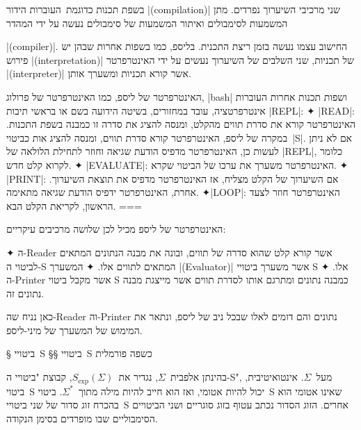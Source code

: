 בשפת תכנות כדוגמת~\CPL העוברות הידור \E|(compilation)| שני מרכיבי השיערוך
נפרדים. מתן המשמעות לסימבולים ואיתור המשמעות של סימבולים נעשה על ידי המהדר

\E|(compiler)|. החישוב עצמו נעשה בזמן ריצת התכנית. בליספ, כמו בשפות אחרות שבהן
יש פירוש \E|(interpretation)| של תכניות, שני השלבים של השיערוך נעשים על ידי
האינטרפרטר \E|(interpreter)| אשר קורא תכניות ומשערך אותן.

\begin{minipage}\linewidth
  \footnotesize
  \begin{mdframed}[backgroundcolor=Lavender!20]
    האינטרפרטר של ליספ, כמו האינטרפרטר של פרולוג, \E|bash| ושפות תכנות אחרות העוברות
    אינטרפרטציה, עובד במחזורים, בשיטה הידועה בשם
    או בראשי תיבות \E|REPL|:
    ✦ \E|READ|: האינטרפרטר קורא את סדרת תווים מהקלט, ומנסה להציג את סדרה זו
    כמבנה בשפת התכנות. במקרה של ליספ, האינטרפרטר קורא סדרת תווים, ומנסה להציג
    אות כביטוי~\E|S|. אם לא ניתן לעשות כן, האינטרפרטר מדפיס הודעת שגיאה וחוזר
    לתחילת הלולאה של \E|REPL|, כלומר לקרוא קלט חדש.
    ✦ \E|EVALUATE|: האינטרפרטר משערך את ערכו של הביטוי שקרא.
    ✦ \E|PRINT|: אם השיערוך של הקלט מצליח, אז האינטרפרטר מדפיס את תוצאת השיערוך.
    אחרת, האינטרפרטר ידפיס הודעת שגיאה מתאימה.
    ✦\E|LOOP|: האינטרפרטר חוזר לצעד הראשון, לקריאת הקלט הבא.
===
\end{mdframed}
\end{minipage}

האינטרפרטר של ליספ מכיל לכן שלושה מרכיבים עיקריים:
\begin{enumerate}
  ✦ ה-Reader אשר קורא קלט שהוא סדרה של תווים, ובונה את מבנה הנתונים המתאים
לביטוי ה-S המתאים לתווים אלו.
  ✦ המשערך \E|(Evaluator)| אשר משערך ביטויי S אלו.
  ✦ ה-Printer אשר מקבל ביטוי S כמבנה נתונים ומתרגם אותו לסדרת תווים אשר
מייצגת מבנה נתונים זה.
\end{enumerate}

כאן נניח שה-Reader וה-Printer נתונים והם דומים לאלו שבכל ניב של ליספ, ונתאר את
המימוש של המשערך של מיני-ליספ.

§ ביטויי~S
§§ ביטויי~S כשפה פורמלית

\newcommand\SX{\ensuremath{S_{\text{exp}}}}

בהינתן אלפבית~$Σ$, נגדיר את~$\SX(Σ)$, קבוצת "ביטויי ה-S", מעל~$Σ$.
אינטואיטיבית, ביטוי~S יכול להיות אטומי, ואז הוא חייב להיות מילה מתוך~$Σ^*$.
ביטוי~S שאינו אטומי הוא בהכרח זוג סדור של שני ביטויי~S אחרים. הזוג הסדור נכתב
עטוף בזוג סוגריים ושני הביטויים הסימבוליים שבו מופרדים בסימן הנקודה.

